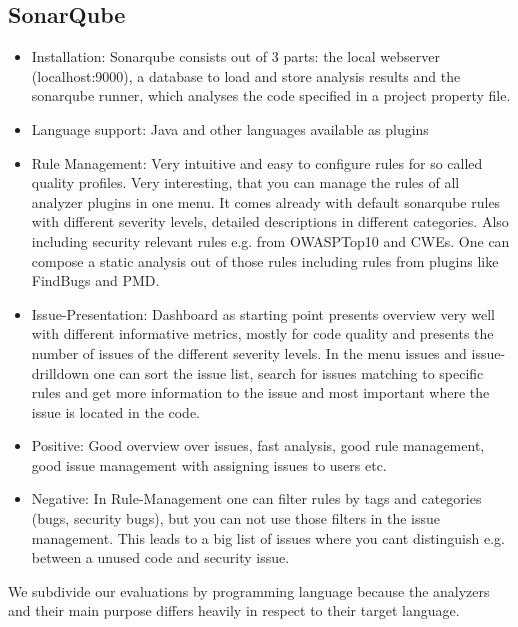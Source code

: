 \documentclass[conference]{IEEEtran}
\begin{document}
\subsection{SonarQube}
\label{subsec:sonarqube}
\begin{itemize}
\item Installation: Sonarqube consists out of 3 parts: the local webserver (localhost:9000), a database to load and store analysis results and the sonarqube runner, which analyses the code specified in a project property file.

\item Language support: Java and other languages available as plugins

\item Rule Management: Very intuitive and easy to configure rules for so called quality profiles. Very interesting, that you can manage the rules of all analyzer plugins in one menu. It comes already with default sonarqube rules with different severity levels, detailed descriptions in different categories. Also including security relevant rules e.g. from OWASPTop10 and CWEs. One can compose a static analysis out of those rules including rules from plugins like FindBugs and PMD.

\item Issue-Presentation: Dashboard as starting point presents overview very well with different informative metrics, mostly for code quality and presents the number of issues of the different severity levels.
In the menu issues and issue-drilldown one can sort the issue list, search for issues matching to specific rules and get more information to the issue and most important where the issue is located in the code.

\item Positive: Good overview over issues, fast analysis, good rule management, good issue management with assigning issues to users etc.

\item Negative: In Rule-Management one can filter rules by tags and categories (bugs, security bugs), but you can not use those filters in the issue management. This leads to a big list of issues where you cant distinguish e.g. between a unused code and security issue.
 
\end{itemize}

We subdivide our evaluations by programming language because the analyzers and their main purpose differs heavily in respect to their target language.
\end{document}
